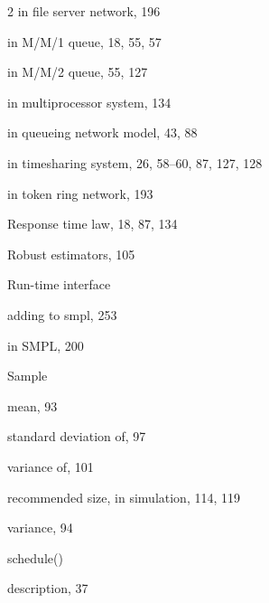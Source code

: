 \begin{multicols}{2}
\quad in file server network, 196\par
\quad in M/M/1 queue, 18, 55, 57\par
\quad in M/M/2 queue, 55, 127\par
\quad in multiprocessor system, 134\par
\quad in queueing network model, 43, 88\par
\quad in timesharing system, 26, 58--60, 87, 127, 128\par
\quad in token ring network, 193\par
\noindent Response time law, 18, 87, 134\par
\noindent Robust estimators, 105\par
\noindent Run-time interface\par
\quad adding to smpl, 253\par
\quad in SMPL, 200\par
\noindent Sample\par
\quad mean, 93\par
\qquad standard deviation of, 97\par
\qquad variance of, 101\par
\quad recommended size, in simulation, 114, 119\par
\quad variance, 94\par
\noindent schedule()\par
\quad description, 37\par
\end{multicols}
